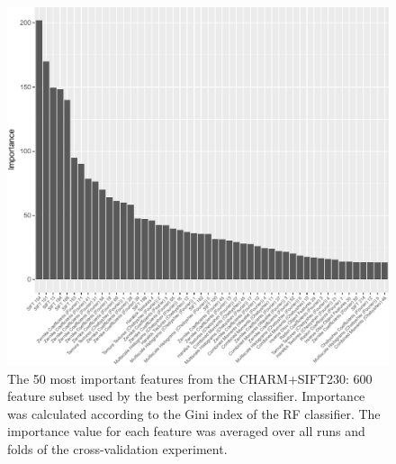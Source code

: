 \begin{figure}
	\centering
	\includegraphics[width=\columnwidth]{fig08}
	\caption{The 50 most important features from the CHARM+SIFT230: 600 feature subset used by the best performing classifier. Importance was calculated according to the Gini index of the RF classifier. The importance value for each feature was averaged over all runs and folds of the cross-validation experiment.}
	\label{fig:importanceFeatures}
\end{figure}

